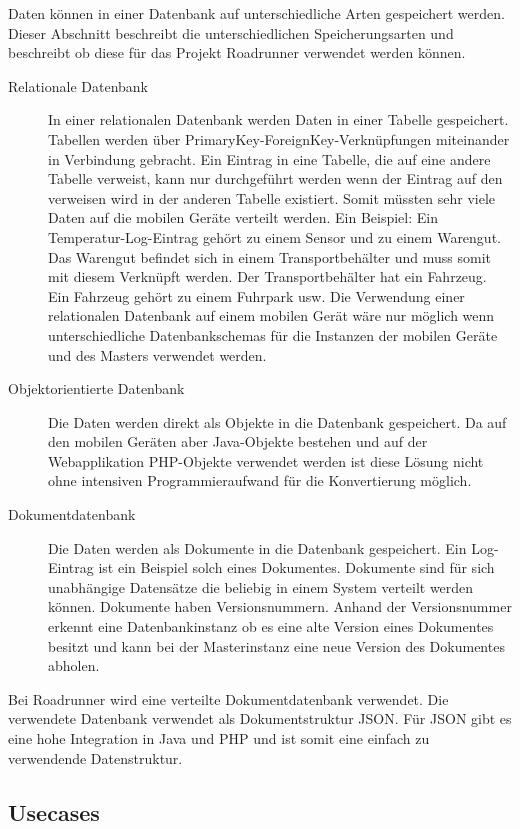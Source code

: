 \begin{appendix}
	Daten können in einer Datenbank auf unterschiedliche Arten gespeichert werden. Dieser Abschnitt beschreibt die unterschiedlichen Speicherungsarten und beschreibt ob diese für das Projekt Roadrunner verwendet werden können.

	\begin{description}
		\item[Relationale Datenbank] In einer relationalen Datenbank werden Daten in einer Tabelle gespeichert. Tabellen werden über PrimaryKey-ForeignKey-Verknüpfungen miteinander in Verbindung gebracht. Ein Eintrag in eine Tabelle, die auf eine andere Tabelle verweist, kann nur durchgeführt werden wenn der Eintrag auf den verweisen wird in der anderen Tabelle existiert. Somit müssten sehr viele Daten auf die mobilen Geräte verteilt werden. Ein Beispiel: Ein Temperatur-Log-Eintrag gehört zu einem Sensor und zu einem Warengut. Das Warengut befindet sich in einem Transportbehälter und muss somit mit diesem Verknüpft werden. Der Transportbehälter hat ein Fahrzeug. Ein Fahrzeug gehört zu einem Fuhrpark usw. Die Verwendung einer relationalen Datenbank auf einem mobilen Gerät wäre nur möglich wenn unterschiedliche Datenbankschemas für die Instanzen der mobilen Geräte und des Masters verwendet werden. 
		\item[Objektorientierte Datenbank] Die Daten werden direkt als Objekte in die Datenbank gespeichert. Da auf den mobilen Geräten aber Java-Objekte bestehen und auf der Webapplikation PHP-Objekte verwendet werden ist diese Lösung nicht ohne intensiven Programmieraufwand für die Konvertierung möglich.
		\item[Dokumentdatenbank] Die Daten werden als Dokumente in die Datenbank gespeichert. Ein Log-Eintrag ist ein Beispiel solch eines Dokumentes. Dokumente sind für sich unabhängige Datensätze die beliebig in einem System verteilt werden können. Dokumente haben Versionsnummern. Anhand der Versionsnummer erkennt eine Datenbankinstanz ob es eine alte Version eines Dokumentes besitzt und kann bei der Masterinstanz eine neue Version des Dokumentes abholen.
	\end{description}

	Bei Roadrunner wird eine verteilte Dokumentdatenbank verwendet. Die verwendete Datenbank verwendet als Dokumentstruktur JSON. Für JSON gibt es eine hohe Integration in Java und PHP und ist somit eine einfach zu verwendende Datenstruktur.





	\subsection{Usecases}


\end{appendix}
